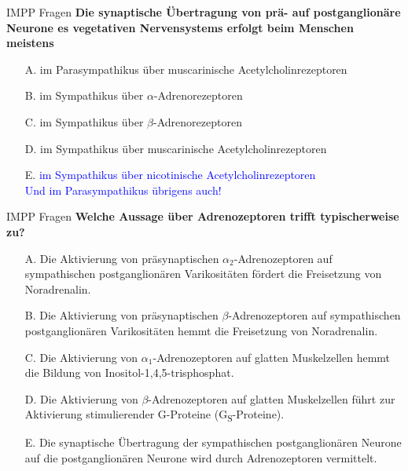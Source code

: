 \documentclass{beamer}
\begin{document}
\begin{frame}{IMPP Fragen}
\textbf{Die synaptische Übertragung von prä- auf postganglionäre Neurone es vegetativen Nervensystems erfolgt beim Menschen meistens} \\[0.2 cm]

\begin{itemize}
\item[A.] im Parasympathikus über muscarinische Acetylcholinrezeptoren
\item[B.] im Sympathikus über \(\alpha\)-Adrenorezeptoren
\item[C.] im Sympathikus über \(\beta\)-Adrenorezeptoren
\item[D.] im Sympathikus über muscarinische Acetylcholinrezeptoren
\item[E.] \textcolor{blue}{im Sympathikus über nicotinische Acetylcholinrezeptoren} \\ %
\pause
\textcolor{blue}{Und im Parasympathikus übrigens auch!}
\end{itemize}
\end{frame}



\begin{frame}{IMPP Fragen}
\textbf{Welche Aussage über Adrenozeptoren trifft typischerweise zu?} \\[0.2 cm]

\begin{itemize}
\item[A.] Die Aktivierung von präsynaptischen \(\alpha_2\)-Adrenozeptoren auf sympathischen postganglionären Varikositäten fördert die Freisetzung von Noradrenalin. 
\item[B.] Die Aktivierung von präsynaptischen \(\beta\)-Adrenozeptoren auf sympathischen  postganglionären Varikositäten hemmt die Freisetzung von Noradrenalin. 
\item[C.] Die Aktivierung von \(\alpha_1\)-Adrenozeptoren auf glatten Muskelzellen hemmt die Bildung von Inositol-1,4,5-trisphosphat.
\item[D.] Die Aktivierung von \(\beta\)-Adrenozeptoren auf glatten Muskelzellen führt zur Aktivierung stimulierender G-Proteine (G\textsubscript{S}-Proteine).
\item[E.] Die synaptische Übertragung der sympathischen postganglionären Neurone auf die postganglionären Neurone wird durch Adrenozeptoren vermittelt. 

\end{itemize}
\end{frame}
\end{document}
